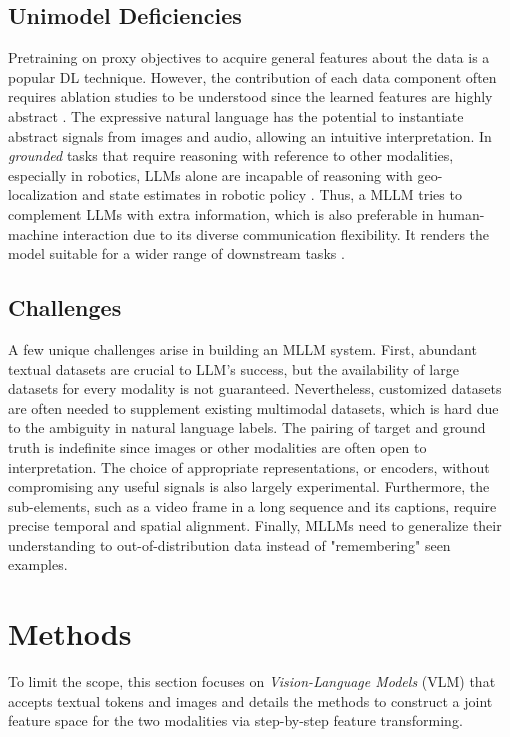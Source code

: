 \documentclass[11pt]{article}
\begin{document}
\subsection{Unimodel Deficiencies}
Pretraining on proxy objectives to acquire general features about the data is a popular DL technique. However, the contribution of each data component often requires ablation studies to be understood since the learned features are highly abstract \citep{DBLP:conf/cvpr/ZhaoJK20}. The expressive natural language has the potential to instantiate abstract signals from images and audio, allowing an intuitive interpretation. In \textit{grounded} tasks that require reasoning with reference to other modalities, especially in robotics, LLMs alone are incapable of reasoning with geo-localization and state estimates in robotic policy \citep{DBLP:conf/icml/DriessXSLCIWTVY23}. Thus, a MLLM tries to complement LLMs with extra information, which is also preferable in human-machine interaction due to its diverse communication flexibility. It renders the model suitable for a wider range of downstream tasks \cite{gpt4, dalle3}.

\subsection{Challenges}
A few unique challenges arise in building an MLLM system. First, abundant textual datasets are crucial to LLM's success, but the availability of large datasets for every modality is not guaranteed. Nevertheless, customized datasets are often needed to supplement existing multimodal datasets, which is hard due to the ambiguity in natural language labels. The pairing of target and ground truth is indefinite since images or other modalities are often open to interpretation. The choice of appropriate representations, or encoders, without compromising any useful signals is also largely experimental. Furthermore, the sub-elements, such as a video frame in a long sequence and its captions, require precise temporal and spatial alignment. Finally, MLLMs need to generalize their understanding to out-of-distribution data instead of "remembering" seen examples. 

\section{Methods}
 To limit the scope, this section focuses on \textit{Vision-Language Models} (VLM) that accepts textual tokens and images and details the methods to construct a joint feature space for the two modalities via step-by-step feature transforming. 
\end{document}
